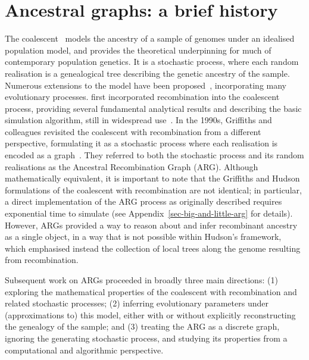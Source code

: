 \documentclass[9pt,twocolumn,twoside]{gsajnl}
\begin{document}
\section{Ancestral graphs: a brief history}
\label{sec-arg-history}
The coalescent~\citep{kingman1982coalescent,kingman1982genealogy,
hudson1983testing, tajima1983evolutionary} models the ancestry of a sample of
genomes under an idealised population model, and provides the theoretical
underpinning for much of contemporary population genetics.
It is a stochastic process, where each random realisation
is a genealogical tree describing the genetic ancestry of the sample.
Numerous extensions to the model have been
proposed~\citep{hudson1990gene,hein2004gene,wakely2008coalescent},
incorporating many evolutionary processes.
\citet{hudson1983properties}
first incorporated recombination into the coalescent process,
providing several fundamental analytical results
and describing the basic simulation algorithm, still in
widespread use~\citep{hudson2002generating,kelleher2016efficient,
kelleher2020coalescent,baumdicker2021efficient}.
In the 1990s, Griffiths and colleagues revisited the
coalescent with recombination from a different perspective,
formulating it as a stochastic process where each realisation
is encoded as a graph~\citep{griffiths1991two,ethier1990two,
griffiths1996ancestral,griffiths1997ancestral}.
They referred to both the stochastic process and
its random realisations as the Ancestral Recombination Graph (ARG).
Although mathematically equivalent, it is
important to note that the Griffiths and Hudson formulations of
the coalescent with recombination are not identical;
in particular, a direct implementation of the ARG process
as originally described requires exponential time to simulate
(see Appendix~\ref{sec-big-and-little-arg} for details).
However, ARGs provided a way
to reason about and infer recombinant ancestry as a single object,
in a way that is not possible within Hudson's framework, which emphasised
instead the collection of local trees along the genome
resulting from recombination.

Subsequent work on ARGs proceeded in broadly three main directions:
(1) exploring the mathematical properties of the coalescent with recombination and
related stochastic processes;
(2) inferring evolutionary parameters under
(approximations to) this model, either with or without explicitly reconstructing the
genealogy of the sample;
and (3) treating the ARG as a discrete graph, ignoring the
generating stochastic process, and studying its properties from a computational and
algorithmic perspective.
\end{document}
